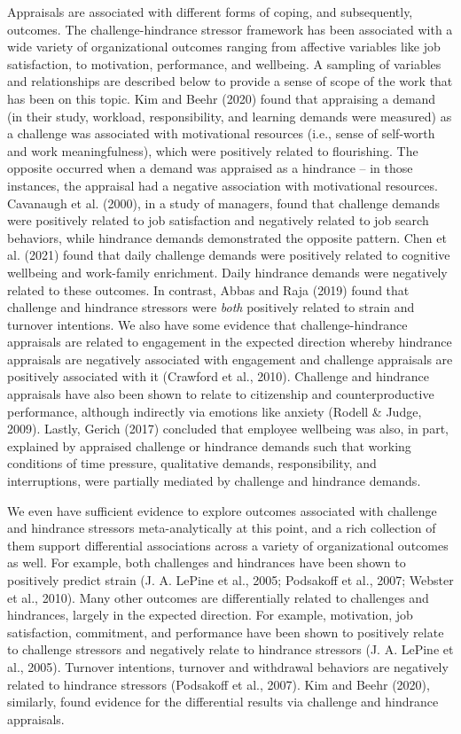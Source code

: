 \documentclass[
  man,mask]{apa6}
\begin{document}
Appraisals are associated with different forms of coping, and subsequently, outcomes. The challenge-hindrance stressor framework has been associated with a wide variety of organizational outcomes ranging from affective variables like job satisfaction, to motivation, performance, and wellbeing. A sampling of variables and relationships are described below to provide a sense of scope of the work that has been on this topic. Kim and Beehr (2020) found that appraising a demand (in their study, workload, responsibility, and learning demands were measured) as a challenge was associated with motivational resources (i.e., sense of self-worth and work meaningfulness), which were positively related to flourishing. The opposite occurred when a demand was appraised as a hindrance -- in those instances, the appraisal had a negative association with motivational resources. Cavanaugh et al. (2000), in a study of managers, found that challenge demands were positively related to job satisfaction and negatively related to job search behaviors, while hindrance demands demonstrated the opposite pattern. Chen et al. (2021) found that daily challenge demands were positively related to cognitive wellbeing and work-family enrichment. Daily hindrance demands were negatively related to these outcomes. In contrast, Abbas and Raja (2019) found that challenge and hindrance stressors were \emph{both} positively related to strain and turnover intentions. We also have some evidence that challenge-hindrance appraisals are related to engagement in the expected direction whereby hindrance appraisals are negatively associated with engagement and challenge appraisals are positively associated with it (Crawford et al., 2010). Challenge and hindrance appraisals have also been shown to relate to citizenship and counterproductive performance, although indirectly via emotions like anxiety (Rodell \& Judge, 2009). Lastly, Gerich (2017) concluded that employee wellbeing was also, in part, explained by appraised challenge or hindrance demands such that working conditions of time pressure, qualitative demands, responsibility, and interruptions, were partially mediated by challenge and hindrance demands.

We even have sufficient evidence to explore outcomes associated with challenge and hindrance stressors meta-analytically at this point, and a rich collection of them support differential associations across a variety of organizational outcomes as well. For example, both challenges and hindrances have been shown to positively predict strain (J. A. LePine et al., 2005; Podsakoff et al., 2007; Webster et al., 2010). Many other outcomes are differentially related to challenges and hindrances, largely in the expected direction. For example, motivation, job satisfaction, commitment, and performance have been shown to positively relate to challenge stressors and negatively relate to hindrance stressors (J. A. LePine et al., 2005). Turnover intentions, turnover and withdrawal behaviors are negatively related to hindrance stressors (Podsakoff et al., 2007). Kim and Beehr (2020), similarly, found evidence for the differential results via challenge and hindrance appraisals.
\end{document}
